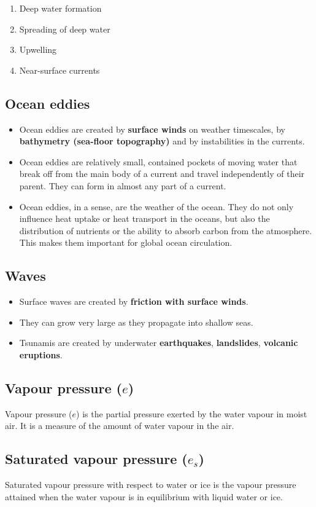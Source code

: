 \documentclass[11pt]{article}
\begin{document}
\begin{enumerate}
\item Deep water formation
\item Spreading of deep water
\item Upwelling
\item Near-surface currents
\end{enumerate}
\subsection{Ocean eddies}
\label{sec:orge4c1ed5}
\begin{itemize}
\item Ocean eddies are created by \textbf{surface winds} on weather timescales, by \textbf{bathymetry (sea-floor topography)} and by instabilities in the currents.
\item Ocean eddies are relatively small, contained pockets of moving water that break off from the main body of a current and travel independently of their parent. They can form in almost any part of a current.
\item Ocean eddies, in a sense, are the weather of the ocean. They do not only influence heat uptake or heat transport in the oceans, but also the distribution of nutrients or the ability to absorb carbon from the atmosphere. This makes them important for global ocean circulation.
\end{itemize}
\subsection{Waves}
\label{sec:org4d71d9f}
\begin{itemize}
\item Surface waves are created by \textbf{friction with surface winds}.
\item They can grow very large as they propagate into shallow seas.
\item Tsunamis are created by underwater \textbf{earthquakes}, \textbf{landslides}, \textbf{volcanic eruptions}.
\end{itemize}
\subsection{Vapour pressure (\(e\))}
\label{sec:org075d2f9}
Vapour pressure (\(e\)) is the partial pressure exerted by the water vapour in moist air. It is a measure of the amount of water vapour in the air.

\newpage
\subsection{Saturated vapour pressure (\(e_s\))}
\label{sec:orgee8e13f}
Saturated vapour pressure with respect to water or ice is the vapour pressure attained when the water vapour is in equilibrium with liquid water or ice.
\end{document}
